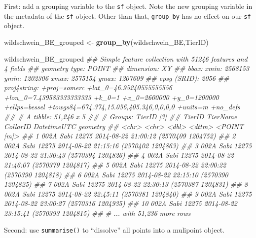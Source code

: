 \documentclass[]{book}
\newenvironment{Shaded}{\begin{snugshade}}{\end{snugshade}}
\newcommand{\CommentTok}[1]{\textcolor[rgb]{0.56,0.35,0.01}{\textit{#1}}}
\newcommand{\KeywordTok}[1]{\textcolor[rgb]{0.13,0.29,0.53}{\textbf{#1}}}
\newcommand{\NormalTok}[1]{#1}
\newcommand{\StringTok}[1]{\textcolor[rgb]{0.31,0.60,0.02}{#1}}
\begin{document}
First: add a grouping variable to the \texttt{sf} object. Note the new grouping variable in the metadata of the \texttt{sf} object. Other than that, \texttt{group\_by} has no effect on our \texttt{sf} object.

\begin{Shaded}
\begin{Highlighting}[]

\NormalTok{wildschwein_BE_grouped <-}\StringTok{ }\KeywordTok{group_by}\NormalTok{(wildschwein_BE,TierID)}

\NormalTok{wildschwein_BE_grouped}
\CommentTok{## Simple feature collection with 51246 features and 4 fields}
\CommentTok{## geometry type:  POINT}
\CommentTok{## dimension:      XY}
\CommentTok{## bbox:           xmin: 2568153 ymin: 1202306 xmax: 2575154 ymax: 1207609}
\CommentTok{## epsg (SRID):    2056}
\CommentTok{## proj4string:    +proj=somerc +lat_0=46.95240555555556 +lon_0=7.439583333333333 +k_0=1 +x_0=2600000 +y_0=1200000 +ellps=bessel +towgs84=674.374,15.056,405.346,0,0,0,0 +units=m +no_defs}
\CommentTok{## # A tibble: 51,246 x 5}
\CommentTok{## # Groups:   TierID [3]}
\CommentTok{##    TierID TierName CollarID DatetimeUTC                  geometry}
\CommentTok{##    <chr>  <chr>       <dbl> <dttm>                    <POINT [m]>}
\CommentTok{##  1 002A   Sabi        12275 2014-08-22 21:00:12 (2570409 1204752)}
\CommentTok{##  2 002A   Sabi        12275 2014-08-22 21:15:16 (2570402 1204863)}
\CommentTok{##  3 002A   Sabi        12275 2014-08-22 21:30:43 (2570394 1204826)}
\CommentTok{##  4 002A   Sabi        12275 2014-08-22 21:46:07 (2570379 1204817)}
\CommentTok{##  5 002A   Sabi        12275 2014-08-22 22:00:22 (2570390 1204818)}
\CommentTok{##  6 002A   Sabi        12275 2014-08-22 22:15:10 (2570390 1204825)}
\CommentTok{##  7 002A   Sabi        12275 2014-08-22 22:30:13 (2570387 1204831)}
\CommentTok{##  8 002A   Sabi        12275 2014-08-22 22:45:11 (2570381 1204840)}
\CommentTok{##  9 002A   Sabi        12275 2014-08-22 23:00:27 (2570316 1204935)}
\CommentTok{## 10 002A   Sabi        12275 2014-08-22 23:15:41 (2570393 1204815)}
\CommentTok{## # ... with 51,236 more rows}
\end{Highlighting}
\end{Shaded}

Second: use \texttt{summarise()} to ``dissolve'' all points into a mulipoint object.
\end{document}
